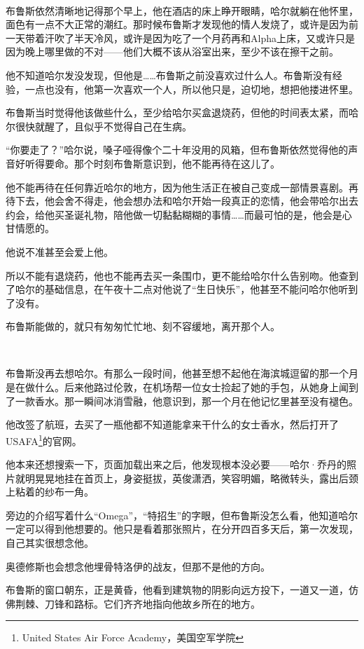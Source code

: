 \documentclass[../main]{subfiles}
\begin{document}
~\

布鲁斯依然清晰地记得那个早上，他在酒店的床上睁开眼睛，哈尔就躺在他怀里，面色有一点不大正常的潮红。那时候布鲁斯才发现他的情人发烧了，或许是因为前一天带着汗吹了半天冷风，或许是因为吃了一个月药再和Alpha上床，又或许只是因为晚上哪里做的不对——他们大概不该从浴室出来，至少不该在擦干之前。

他不知道哈尔发没发现，但他是……布鲁斯之前没喜欢过什么人。布鲁斯没有经验，一点也没有，他第一次喜欢一个人，所以他只是，迫切地，想把他搂进怀里。

布鲁斯当时觉得他该做些什么，至少给哈尔买盒退烧药，但他的时间表太紧，而哈尔很快就醒了，且似乎不觉得自己在生病。

“你要走了？”哈尔说，嗓子哑得像个二十年没用的风箱，但布鲁斯依然觉得他的声音好听得要命。那个时刻布鲁斯意识到，他不能再待在这儿了。

他不能再待在任何靠近哈尔的地方，因为他生活正在被自己变成一部情景喜剧。再待下去，他会舍不得走，他会想办法和哈尔开始一段真正的恋情，他会带哈尔出去约会，给他买圣诞礼物，陪他做一切黏黏糊糊的事情……而最可怕的是，他会是心甘情愿的。

他说不准甚至会爱上他。

所以不能有退烧药，他也不能再去买一条围巾，更不能给哈尔什么告别吻。他查到了哈尔的基础信息，在午夜十二点对他说了“生日快乐”，他甚至不能问哈尔他听到了没有。

布鲁斯能做的，就只有匆匆忙忙地、刻不容缓地，离开那个人。

~\

布鲁斯没再去想哈尔。有那么一段时间，他甚至想不起他在海滨城逗留的那一个月是在做什么。后来他路过伦敦，在机场帮一位女士捡起了她的手包，从她身上闻到了一款香水。那一瞬间冰消雪融，他意识到，那一个月在他记忆里甚至没有褪色。

他改签了航班，去买了一瓶他都不知道能拿来干什么的女士香水，然后打开了USAFA\footnote[1]{United States Air Force Academy，美国空军学院}的官网。

他本来还想搜索一下，页面加载出来之后，他发现根本没必要——哈尔·乔丹的照片就明晃晃地挂在首页上，身姿挺拔，英俊潇洒，笑容明媚，略微转头，露出后颈上粘着的纱布一角。

旁边的介绍写着什么“Omega”，“特招生”的字眼，但布鲁斯没怎么看，他知道哈尔一定可以得到他想要的。他只是看着那张照片，在分开四百多天后，第一次发现，自己其实很想念他。

奥德修斯也会想念他埋骨特洛伊的战友，但那不是他的方向。

布鲁斯的窗口朝东，正是黄昏，他看到建筑物的阴影向远方投下，一道又一道，仿佛荆棘、刀锋和路标。它们齐齐地指向他故乡所在的地方。
\end{document}
